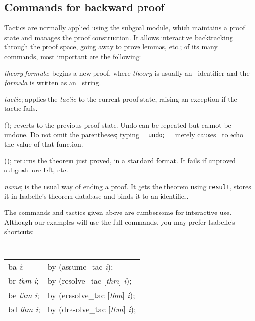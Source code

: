 \subsection{Commands for backward proof}
Tactics are normally applied using the subgoal module, which maintains a
proof state and manages the proof construction.  It allows interactive
backtracking through the proof space, going away to prove lemmas, etc.; of
its many commands, most important are the following:
\begin{ttdescription}
\item[\ttindex{goal} {\it theory} {\it formula}; ] 
begins a new proof, where $theory$ is usually an \ML\ identifier
and the {\it formula\/} is written as an \ML\ string.

\item[\ttindex{by} {\it tactic}; ] 
applies the {\it tactic\/} to the current proof
state, raising an exception if the tactic fails.

\item[\ttindex{undo}(); ]
  reverts to the previous proof state.  Undo can be repeated but cannot be
  undone.  Do not omit the parentheses; typing {\tt\ \ undo;\ \ } merely
  causes \ML\ to echo the value of that function.

\item[\ttindex{result}();]
returns the theorem just proved, in a standard format.  It fails if
unproved subgoals are left, etc.

\item[\ttindex{qed} {\it name};] is the usual way of ending a proof.
  It gets the theorem using {\tt result}, stores it in Isabelle's
  theorem database and binds it to an \ML{} identifier.

\end{ttdescription}
The commands and tactics given above are cumbersome for interactive use.
Although our examples will use the full commands, you may prefer Isabelle's
shortcuts:
\begin{center} \tt
{}   
\begin{tabular}{l@{\qquad\rm abbreviates\qquad}l}
    ba {\it i};           & by (assume_tac {\it i}); \\

    br {\it thm} {\it i}; & by (resolve_tac [{\it thm}] {\it i}); \\

    be {\it thm} {\it i}; & by (eresolve_tac [{\it thm}] {\it i}); \\

    bd {\it thm} {\it i}; & by (dresolve_tac [{\it thm}] {\it i}); 
\end{tabular}
\end{center}

